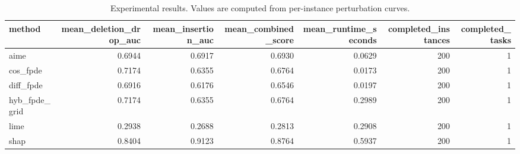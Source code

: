 \begin{table}[t]
\caption{Experimental results. Values are computed from per-instance perturbation curves.}
\label{tab:main_results_computed}
\centering
\begin{tabular}{lrrrrrr}
\toprule
method & mean\_deletion\_drop\_auc & mean\_insertion\_auc & mean\_combined\_score & mean\_runtime\_seconds & completed\_instances & completed\_tasks \\
\midrule
aime & 0.6944 & 0.6917 & 0.6930 & 0.0629 & 200 & 1 \\
cos\_fpde & 0.7174 & 0.6355 & 0.6764 & 0.0173 & 200 & 1 \\
diff\_fpde & 0.6916 & 0.6176 & 0.6546 & 0.0197 & 200 & 1 \\
hyb\_fpde\_grid & 0.7174 & 0.6355 & 0.6764 & 0.2989 & 200 & 1 \\
lime & 0.2938 & 0.2688 & 0.2813 & 0.2908 & 200 & 1 \\
shap & 0.8404 & 0.9123 & 0.8764 & 0.5937 & 200 & 1 \\
\bottomrule
\end{tabular}

\end{table}
